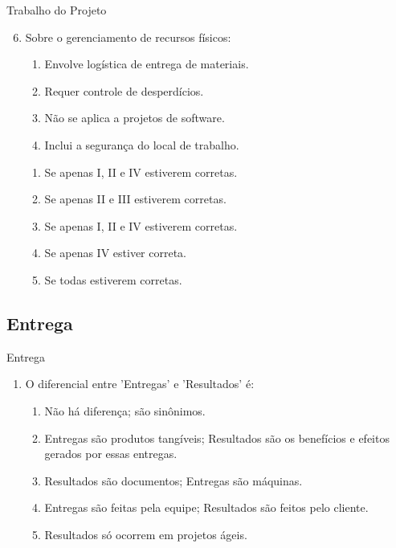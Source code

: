 \documentclass{beamer}
\begin{document}
\begin{frame}{Trabalho do Projeto}
	\begin{enumerate}
		\setcounter{enumi}{5}
		\justifying
		\item Sobre o gerenciamento de recursos físicos:
		\begin{enumerate}[I]
			\item Envolve logística de entrega de materiais.
			\item Requer controle de desperdícios.
			\item Não se aplica a projetos de software.
			\item Inclui a segurança do local de trabalho.
		\end{enumerate}
		\begin{enumerate}[a]
			\item Se apenas I, II e IV estiverem corretas.
			\item Se apenas II e III estiverem corretas.
			\item \alert<2>{Se apenas I, II e IV estiverem corretas.}
			\item Se apenas IV estiver correta.
			\item Se todas estiverem corretas.
		\end{enumerate}
	\end{enumerate}
\end{frame}

\subsection{Entrega}

\begin{frame}{Entrega}
	\begin{enumerate}
		\justifying
		\item O diferencial entre 'Entregas' e 'Resultados' é:
		\begin{enumerate}[a]
			\item Não há diferença; são sinônimos.
			\item \alert<2>{Entregas são produtos tangíveis; Resultados são os benefícios e efeitos gerados por essas entregas.}
			\item Resultados são documentos; Entregas são máquinas.
			\item Entregas são feitas pela equipe; Resultados são feitos pelo cliente.
			\item Resultados só ocorrem em projetos ágeis.
		\end{enumerate}
	\end{enumerate}
\end{frame}
\end{document}
